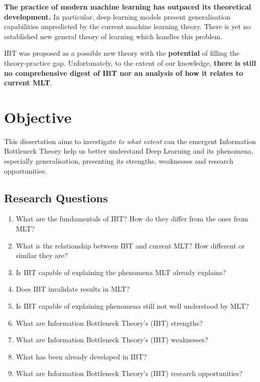 \documentclass[
  letterpaper,
  12pt,
  british]{tufte-book}
\providecommand{\tightlist}{%
  \setlength{\itemsep}{0pt}\setlength{\parskip}{0pt}}\usepackage{longtable,booktabs,array}
\theoremstyle{plain}
\theoremstyle{definition}
\theoremstyle{plain}
\theoremstyle{remark}
\begin{document}
\textbf{The practice of modern machine learning has outpaced its
theoretical development.} In particular, deep learning models present
generalisation capabilities unpredicted by the current machine learning
theory. There is yet no established new general theory of learning which
handles this problem.

{IBT} was proposed as a possible new theory with the \textbf{potential}
of filling the theory-practice gap. Unfortunately, to the extent of our
knowledge, \textbf{there is still no comprehensive digest of {IBT} nor
an analysis of how it relates to current {MLT}}.

\hypertarget{objective}{%
\section{Objective}\label{objective}}

This dissertation aims to investigate \emph{to what extent} can the
emergent Information Bottleneck Theory help us better understand Deep
Learning and its phenomena, especially generalisation, presenting its
strengths, weaknesses and research opportunities.

\hypertarget{research-questions}{%
\subsection{Research Questions}\label{research-questions}}

\begin{enumerate}
\def\labelenumi{\arabic{enumi}.}
\tightlist
\item
  What are the fundamentals of IBT? How do they differ from the ones
  from MLT?
\item
  What is the relationship between IBT and current MLT? How different or
  similar they are?
\item
  Is IBT capable of explaining the phenomena MLT already explains?
\item
  Does IBT invalidate results in MLT?
\item
  Is IBT capable of explaining phenomena still not well understood by
  MLT?
\item
  What are Information Bottleneck Theory's (IBT) strengths?
\item
  What are Information Bottleneck Theory's (IBT) weaknesses?
\item
  What has been already developed in IBT?
\item
  What are Information Bottleneck Theory's (IBT) research opportunities?
\end{enumerate}
\end{document}
